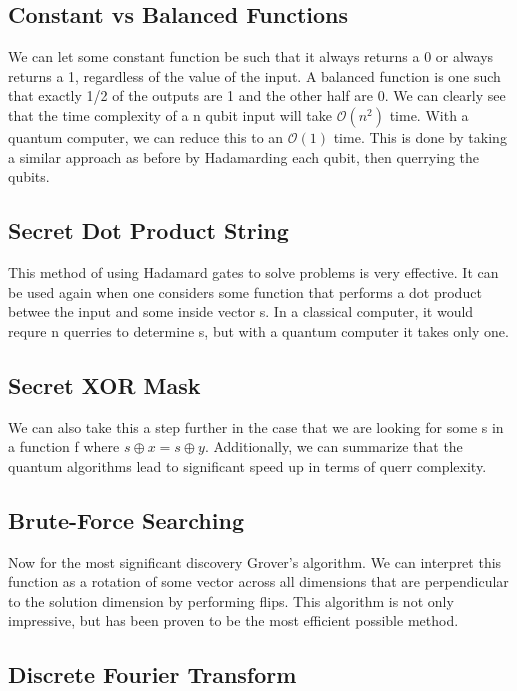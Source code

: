 \documentclass{article}
\begin{document}
\subsection{Constant vs Balanced Functions}

We can let some constant function be such that it always returns a 0 or always returns a 1, regardless of the value of the input. A balanced function is one such that exactly 1/2 of the outputs are 1 and the other half are 0. We can clearly see that the time complexity of a n qubit input will take $\mathcal{O}(n^2)$ time. With a quantum computer, we can reduce this to an $\mathcal{O}(1)$ time. This is done by taking a similar approach as before by Hadamarding each qubit, then querrying the qubits. 

\subsection{Secret Dot Product String}

This method of using Hadamard gates to solve problems is very effective. It can be used again when one considers some function that performs a dot product betwee the input and some inside vector s. In a classical computer, it would requre n querries to determine s, but with a quantum computer it takes only one. 

\subsection{Secret XOR Mask}

We can also take this a step further in the case that we are looking for some s in a function f where $s \oplus x = s \oplus y$. Additionally, we can summarize that the quantum algorithms lead to significant speed up in terms of querr complexity. 

\subsection{Brute-Force Searching}

Now for the most significant discovery Grover's algorithm. We can interpret this function as a rotation of some vector across all dimensions that are perpendicular to the solution dimension by performing flips. This algorithm is not only impressive, but has been proven to be the most efficient possible method. 

\subsection{Discrete Fourier Transform}
\end{document}
